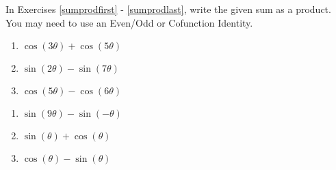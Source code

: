 In Exercises \ref{sumprodfirst} - \ref{sumprodlast},  write the given sum as a product.  You may need to use an Even/Odd or Cofunction Identity.

\begin{multicols}{3}

\begin{enumerate}

\setcounter{enumi}{\value{HW}}

\item $\cos(3\theta) + \cos(5\theta)$ \label{sumprodfirst}
\item $\sin(2\theta) - \sin(7\theta)$
\item $\cos(5\theta) - \cos(6\theta)$

\setcounter{HW}{\value{enumi}}

\end{enumerate}

\end{multicols}

\begin{multicols}{3}

\begin{enumerate}

\setcounter{enumi}{\value{HW}}

\item $\sin(9\theta) - \sin(-\theta)$
\item $\sin(\theta) + \cos(\theta)$
\item $\cos(\theta) - \sin(\theta)$ \label{sumprodlast}

\setcounter{HW}{\value{enumi}}

\end{enumerate}

\end{multicols}

